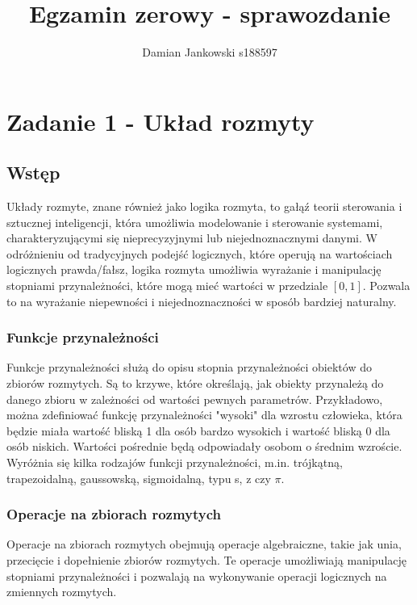 \documentclass{article}
\title{Egzamin zerowy - sprawozdanie}
\author{Damian Jankowski s188597}
\begin{document}
\maketitle

\tableofcontents

\section{Zadanie 1 - Układ rozmyty}

\subsection{Wstęp}

Układy rozmyte, znane również jako logika rozmyta, 
to gałąź teorii sterowania i sztucznej inteligencji, 
która umożliwia modelowanie i sterowanie systemami, 
charakteryzującymi się nieprecyzyjnymi lub niejednoznacznymi danymi. 
W odróżnieniu od tradycyjnych podejść logicznych, 
które operują na wartościach logicznych prawda/fałsz, 
logika rozmyta umożliwia wyrażanie i manipulację stopniami 
przynależności, które mogą mieć wartości w przedziale $[0, 1]$.
Pozwala to na wyrażanie niepewności i niejednoznaczności w sposób 
bardziej naturalny.

\subsubsection{Funkcje przynależności}

Funkcje przynależności służą do opisu stopnia przynależności obiektów 
do zbiorów rozmytych. Są to krzywe, które określają, jak 
obiekty przynależą do danego zbioru w zależności od wartości 
pewnych parametrów. Przykładowo, można zdefiniować funkcję 
przynależności "wysoki" dla wzrostu człowieka, która będzie miała 
wartość bliską 1 dla osób bardzo wysokich i wartość bliską 0 dla 
osób niskich. Wartości pośrednie będą odpowiadały osobom o
średnim wzroście. Wyróżnia się kilka rodzajów funkcji
przynależności, m.in. trójkątną, trapezoidalną, gaussowską,
sigmoidalną, typu s, z czy $\pi$.

\subsubsection{Operacje na zbiorach rozmytych}

Operacje na zbiorach rozmytych obejmują operacje algebraiczne, 
takie jak unia, przecięcie i dopełnienie zbiorów rozmytych. 
Te operacje umożliwiają manipulację stopniami przynależności 
i pozwalają na wykonywanie operacji logicznych na zmiennych rozmytych.
\end{document}
